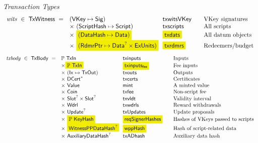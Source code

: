 \begin{figure*}[htb]
  \emph{Transaction Types}
  \begin{equation*}
    \begin{array}{r@{~~}l@{~~}l@{\qquad}l}
      \var{wits} ~\in~ \TxWitness ~=~
       & (\VKey \mapsto \Sig) & \fun{txwitsVKey} & \text{VKey signatures}\\
       & \times ~(\ScriptHash \mapsto \Script)  & \fun{txscripts} & \text{All scripts}\\
       & \times~ \hldiff{(\DataHash \mapsto \Data)} & \hldiff{\fun{txdats}} & \text{All datum objects}\\
       & \times ~\hldiff{(\RdmrPtr \mapsto \Data^? \times \ExUnits)}& \hldiff{\fun{txrdmrs}}& \text{Redeemers/budget}\\
    \end{array}
  \end{equation*}
  \begin{equation*}
    \begin{array}{r@{~~}l@{~~}l@{\qquad}l}
      \var{txbody} ~\in~ \TxBody ~=~
      & \powerset{\TxIn} & \fun{txinputs}& \text{Inputs}\\
      & \times \hldiff{\powerset{\TxIn}} & \hldiff{\fun{txinputs_{fee}}}& \text{Fee inputs}\\
      &\times ~(\Ix \mapsto \TxOut) & \fun{txouts}& \text{Outputs}\\
      & \times~ \seqof{\DCert} & \fun{txcerts}& \text{Certificates}\\
       & \times ~\Value  & \fun{mint} &\text{A minted value}\\
       & \times ~\Coin & \fun{txfee} &\text{Non-script fee}\\
       & \times ~\Slot^? \times \Slot^? & \fun{txvldt} & \text{Validity interval}\\
       & \times~ \Wdrl  & \fun{txwdrls} &\text{Reward withdrawals}\\
       & \times ~\Update^?  & \fun{txUpdates} & \text{Update proposals}\\
       & \times ~\hldiff{\powerset{\KeyHash}} & \hldiff{\fun{reqSignerHashes}} & \text{Hashes of VKeys passed to scripts}\\
       & \times ~\hldiff{\WitnessPPDataHash^?} & \hldiff{\fun{wppHash}} & \text{Hash of script-related data}\\
       & \times ~\AuxiliaryDataHash^? & \fun{txADhash} & \text{Auxiliary data hash}\\
    \end{array}

\end{equation*}
\end{figure*}
